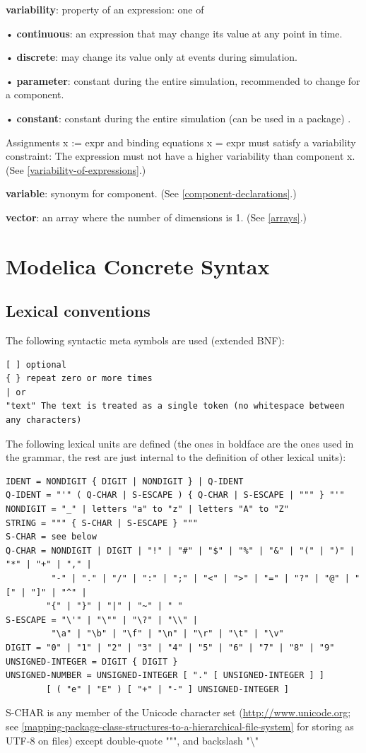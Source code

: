 \documentclass[10pt,a4paper]{report}
\def\doublelabel#1{\label{#1}\hypertarget{#1}{}}
\begin{document}
\textbf{variability}: property of an expression: one of

• \textbf{continuous}: an expression that may change its value at any
point in time.

• \textbf{discrete}: may change its value only at events during
simulation.

• \textbf{parameter}: constant during the entire simulation, recommended
to change for a component.

• \textbf{constant}: constant during the entire simulation (can be used
in a package) .

Assignments x := expr and binding equations x = expr must satisfy a
variability constraint: The expression must not have a higher
variability than component x. (See \ref{variability-of-expressions}.)

\textbf{variable}: synonym for component. (See \ref{component-declarations}.)

\textbf{vector}: an array where the number of dimensions is 1. (See
\ref{arrays}.)

\chapter{Modelica Concrete Syntax}\doublelabel{modelica-concrete-syntax}
\section{Lexical conventions}\doublelabel{lexical-conventions}

The following syntactic meta symbols are used (extended BNF):
\begin{lstlisting}[language=grammar]
[ ] optional
{ } repeat zero or more times
| or
"text" The text is treated as a single token (no whitespace between any characters)
\end{lstlisting}

The following lexical units are defined (the ones in boldface are the
ones used in the grammar, the rest are just internal to the definition
of other lexical units):

\begin{lstlisting}[language=grammar]
IDENT = NONDIGIT { DIGIT | NONDIGIT } | Q-IDENT
Q-IDENT = "'" ( Q-CHAR | S-ESCAPE ) { Q-CHAR | S-ESCAPE | """ } "'"
NONDIGIT = "_" | letters "a" to "z" | letters "A" to "Z"
STRING = """ { S-CHAR | S-ESCAPE } """
S-CHAR = see below
Q-CHAR = NONDIGIT | DIGIT | "!" | "#" | "$" | "%" | "&" | "(" | ")" | "*" | "+" | "," |
         "-" | "." | "/" | ":" | ";" | "<" | ">" | "=" | "?" | "@" | "[" | "]" | "^" |
        "{" | "}" | "|" | "~" | " "
S-ESCAPE = "\'" | "\"" | "\?" | "\\" |
         "\a" | "\b" | "\f" | "\n" | "\r" | "\t" | "\v"
DIGIT = "0" | "1" | "2" | "3" | "4" | "5" | "6" | "7" | "8" | "9"
UNSIGNED-INTEGER = DIGIT { DIGIT }
UNSIGNED-NUMBER = UNSIGNED-INTEGER [ "." [ UNSIGNED-INTEGER ] ]
        [ ( "e" | "E" ) [ "+" | "-" ] UNSIGNED-INTEGER ]
\end{lstlisting}
\textrm{S-CHAR} is any member of the Unicode character set
(\url{http://www.unicode.org}; see \ref{mapping-package-class-structures-to-a-hierarchical-file-system} for storing as UTF-8 on files) except double-quote """, and backslash "\textbackslash{}"
\end{document}
